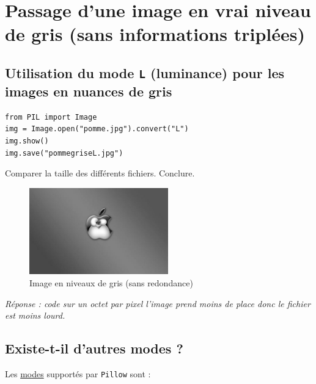 \documentclass[11pt]{article}
\begin{document}
\section{Passage d'une image en vrai niveau de gris (sans informations triplées)}
\label{sec:orgd9418d3}


\subsection{Utilisation du mode \texttt{L} (luminance) pour les images en nuances de gris}
\label{sec:org451a270}

\begin{verbatim}
from PIL import Image
img = Image.open("pomme.jpg").convert("L")
img.show()
img.save("pommegriseL.jpg")
\end{verbatim}

Comparer la taille des différents fichiers. Conclure.

\begin{figure}[htbp]
\centering
\includegraphics[width=6cm]{pommegriseL.jpg}
\caption{Image en niveaux de gris (sans redondance)}
\end{figure}

\emph{Réponse : code sur un octet par pixel l'image prend moins de place donc le fichier est moins lourd.}

\subsection{Existe-t-il d'autres modes ?}
\label{sec:orgabf32b9}

Les \href{https://pillow.readthedocs.io/en/latest/handbook/concepts.html\#modes}{modes} supportés par \texttt{Pillow} sont : 
\end{document}
